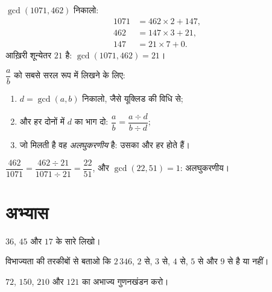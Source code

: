 \begin{example}\label{ex:g9:arith:euclidalgo}
$\gcd(1071, 462)$ निकालो:
\begin{align*}
1071 &= 462 \times 2 + 147, \\
462 &= 147 \times 3 + 21, \\
147 &= 21 \times 7 + 0 .
\end{align*}
आख़िरी शून्येतर  $21$ है: $\gcd(1071, 462) = 21$।
\end{example}

\begin{method}\label{met:g9:arith:simplify}
$\dfrac ab$ को सबसे सरल रूप में लिखने के लिए:
\begin{enumerate}
  \item $d = \gcd(a, b)$ निकालो, जैसे यूक्लिड की विधि से;
  \item {} और हर दोनों में $d$ का भाग दो:
        $\dfrac ab = \dfrac{a \div d}{b \div d}$;
  \item जो  मिलती है वह \emph{अलघुकरणीय} है: उसका  और हर
         होते हैं।
\end{enumerate}
\end{method}

\begin{example}
$\dfrac{462}{1071} = \dfrac{462 \div 21}{1071 \div 21} = \dfrac{22}{51}$,
और $\gcd(22, 51) = 1$: अलघुकरणीय।
\end{example}

\section{अभ्यास}

\begin{exercise}[$\star$]\label{exo:g9:arith:1}
$36$, $45$ और $17$ के सारे  लिखो।
\end{exercise}

\begin{exercise}[$\star$]\label{exo:g9:arith:2}
विभाज्यता की तरकीबों से बताओ कि $2\,346$, $2$ से, $3$ से, $4$ से,
$5$ से और $9$ से  है या नहीं।
\end{exercise}

\begin{exercise}[$\star$]\label{exo:g9:arith:3}
$72$, $150$, $210$ और $121$ का अभाज्य गुणनखंडन करो।
\end{exercise}

